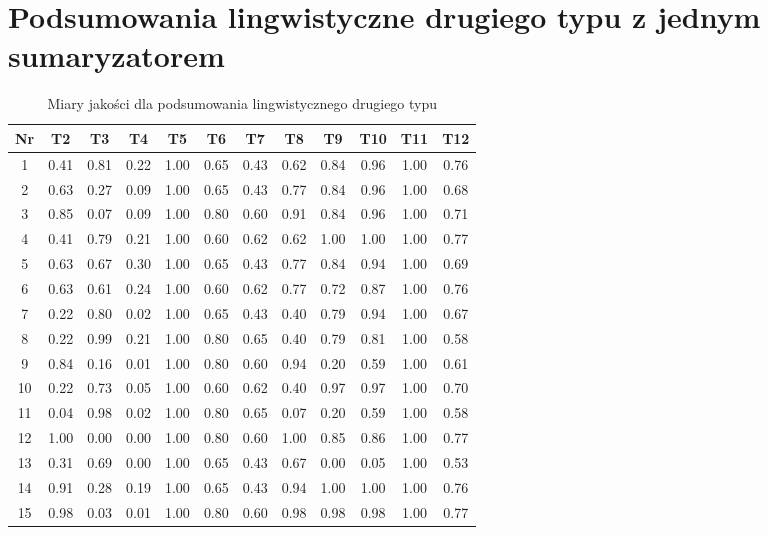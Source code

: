 \documentclass{article}
\begin{document}
    \section{Podsumowania lingwistyczne drugiego typu z jednym sumaryzatorem}
    
    \begin{table}[h!]
    \centering
    \begin{tabular}{|c|c|c|c|c|c|c|c|c|c|c|c|}
    \hline
    Nr & T2 & T3 & T4 & T5 & T6 & T7 & T8 & T9 & T10 & T11 & T12 \\
    \hline

    1 & 0.41 & 0.81 & 0.22 & 1.00 & 0.65 & 0.43 & 0.62 & 0.84 & 0.96 & 1.00 & 0.76 \\
    \hline
    2 & 0.63 & 0.27 & 0.09 & 1.00 & 0.65 & 0.43 & 0.77 & 0.84 & 0.96 & 1.00 & 0.68 \\
    \hline
    3 & 0.85 & 0.07 & 0.09 & 1.00 & 0.80 & 0.60 & 0.91 & 0.84 & 0.96 & 1.00 & 0.71 \\
    \hline
    4 & 0.41 & 0.79 & 0.21 & 1.00 & 0.60 & 0.62 & 0.62 & 1.00 & 1.00 & 1.00 & 0.77 \\
    \hline
    5 & 0.63 & 0.67 & 0.30 & 1.00 & 0.65 & 0.43 & 0.77 & 0.84 & 0.94 & 1.00 & 0.69 \\
    \hline
    6 & 0.63 & 0.61 & 0.24 & 1.00 & 0.60 & 0.62 & 0.77 & 0.72 & 0.87 & 1.00 & 0.76 \\
    \hline
    7 & 0.22 & 0.80 & 0.02 & 1.00 & 0.65 & 0.43 & 0.40 & 0.79 & 0.94 & 1.00 & 0.67 \\
    \hline
    8 & 0.22 & 0.99 & 0.21 & 1.00 & 0.80 & 0.65 & 0.40 & 0.79 & 0.81 & 1.00 & 0.58 \\
    \hline
    9 & 0.84 & 0.16 & 0.01 & 1.00 & 0.80 & 0.60 & 0.94 & 0.20 & 0.59 & 1.00 & 0.61 \\
    \hline
    10 & 0.22 & 0.73 & 0.05 & 1.00 & 0.60 & 0.62 & 0.40 & 0.97 & 0.97 & 1.00 & 0.70 \\
    \hline
    11 & 0.04 & 0.98 & 0.02 & 1.00 & 0.80 & 0.65 & 0.07 & 0.20 & 0.59 & 1.00 & 0.58 \\
    \hline
    12 & 1.00 & 0.00 & 0.00 & 1.00 & 0.80 & 0.60 & 1.00 & 0.85 & 0.86 & 1.00 & 0.77 \\
    \hline
    13 & 0.31 & 0.69 & 0.00 & 1.00 & 0.65 & 0.43 & 0.67 & 0.00 & 0.05 & 1.00 & 0.53 \\
    \hline
    14 & 0.91 & 0.28 & 0.19 & 1.00 & 0.65 & 0.43 & 0.94 & 1.00 & 1.00 & 1.00 & 0.76 \\
    \hline
    15 & 0.98 & 0.03 & 0.01 & 1.00 & 0.80 & 0.60 & 0.98 & 0.98 & 0.98 & 1.00 & 0.77 \\
    \hline
    \end{tabular}
    \caption{Miary jakości dla podsumowania lingwistycznego drugiego typu}
    \end{table}
\end{document}
